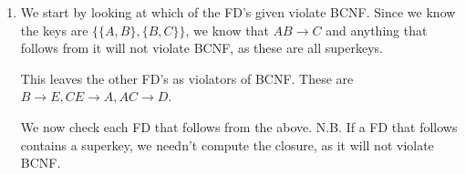 \documentclass[12pt,letterpaper]{article}
\newcommand{\closure}[1]{\{#1\}^+}
\begin{document}
\begin{enumerate}
\begin{enumerate}
\begin{proof}
\begin{itemize}
                So, we cannot simplify the left sides of any of our FD's.

              \item
                We check to see if we can remove any FD's from the set by computing the closure of the left with the rest of the set.

                \begin{itemize}
                  \item $AB \rightarrow C$
                    \[\closure{A, B} = \{A, B, E\}\]

                    Since this did not close over $C$, we cannot remove this FD.
                  \item $B \rightarrow E$
                    \[\closure{B} = \{B\}\]

                    Since this did not close over $E$, we cannot remove this FD.
                  \item $CE \rightarrow A$
                    \[\closure{C, E} = \{C, E\}\]

                    Since this did not close over $A$, we cannot remove this FD.
                  \item $AC \rightarrow D$
                    \[\closure{A, C} = \{A, C\}\]

                    Since this did not close over $D$, we cannot remove this FD.
                \end{itemize}

                So, we cannot remove any FD's from the set.
            \end{itemize}

            Since we already have every right side being singleton,
            we cannot simplify the left sides of any of the FD's,
            and we cannot remove any FD's,
            this is a minimal basis.
          \end{proof}
        \item
          We start by looking at which of the FD's given violate BCNF.
          Since we know the keys are $\{\{A,B\}, \{B,C\}\}$,
          we know that $AB \rightarrow C$ and anything that follows from it will not violate BCNF,
          as these are all superkeys.

          This leaves the other FD's as violators of BCNF.
          These are $B \rightarrow E, CE \rightarrow A, AC \rightarrow D$.

          We now check each FD that follows from the above.
          N.B. If a FD that follows contains a superkey,
          we needn't compute the closure, as it will not violate BCNF.


\end{enumerate}
\end{enumerate}
\end{document}
